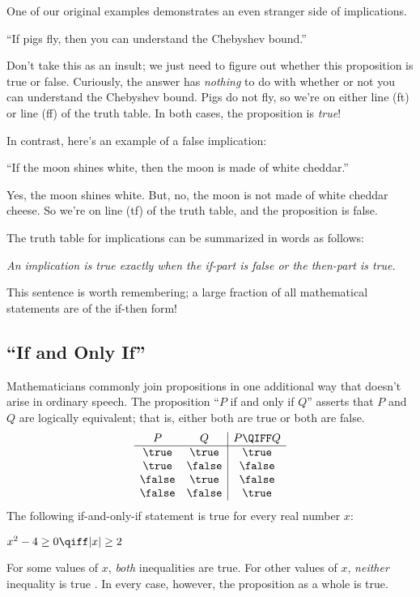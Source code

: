 One of our original examples demonstrates an even stranger side of
implications.
%
\begin{center}
``If pigs fly, then you can understand the Chebyshev bound.''
\end{center}
%
Don't take this as an insult; we just need to figure out whether this
proposition is true or false.  Curiously, the answer has \textit{nothing}
to do with whether or not you can understand the Chebyshev bound.  Pigs do
not fly, so we're on either line (ft) or line (ff) of the truth table.  In
both cases, the proposition is \textit{true}!

In contrast, here's an example of a false implication:
%
\begin{center}
``If the moon shines white, then the moon is made of white cheddar.''
\end{center}
%
Yes, the moon shines white.  But, no, the moon is not made of white
cheddar cheese.  So we're on line (tf) of the truth table, and the
proposition is false.

The truth table for implications can be summarized in words as
follows:
%
\begin{center}
\textit{An implication is true exactly when the if-part is false or the
then-part is true.}
\end{center}
%
This sentence is worth remembering; a large fraction of all
mathematical statements are of the if-then form!

\subsection{``If and Only If''}

Mathematicians commonly join propositions in one additional way that
doesn't arise in ordinary speech.  The proposition ``$P$ if and only
if $Q$'' asserts that $P$ and $Q$ are logically equivalent; that is,
either both are true or both are false.
%
\[
\begin{array}{cc|c}
P & Q & P \QIFF Q \\ \hline
\true & \true & \true \\
\true & \false & \false \\
\false & \true & \false \\
\false & \false & \true
\end{array}
\]
%
The following if-and-only-if statement is true for every real number
$x$:
%
\begin{center}
$x^2 - 4 \geq 0 \qiff |x| \geq 2$
\end{center}
%
For some values of $x$, \textit{both} inequalities are true.  For
other values of $x$, \textit{neither} inequality is true .  In every
case, however, the proposition as a whole is true.

